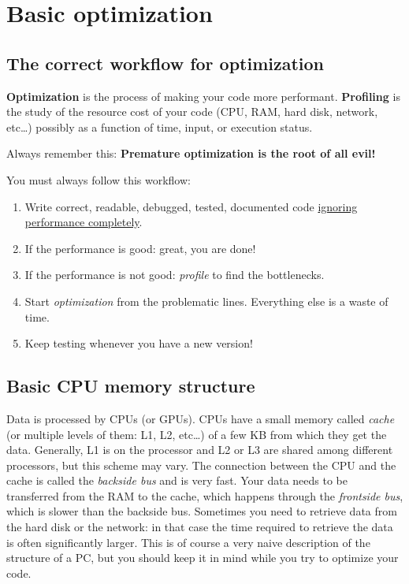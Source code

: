 \section{Basic optimization}

\subsection{The correct workflow for optimization}
\textbf{Optimization} is the process of making your code more performant. \textbf{Profiling} is the study of the resource cost of your code (CPU, RAM, hard disk, network, etc\dots) possibly as a function of time, input, or execution status.

Always remember this: \textbf{Premature optimization is the root of all evil!}

You must always follow this workflow:
\begin{enumerate}
    \item Write correct, readable, debugged, tested, documented code \underline{ignoring performance completely}.
    \item If the performance is good: great, you are done!
    \item If the performance is not good: \textit{profile} to find the bottlenecks.
    \item Start \textit{optimization} from the problematic lines. Everything else is a waste of time.
    \item Keep testing whenever you have a new version!
\end{enumerate}

\subsection{Basic CPU memory structure}
Data is processed by CPUs (or GPUs). CPUs have a small memory called \textit{cache} (or multiple levels of them: L1, L2, etc\dots) of a few KB from which they get the data. Generally, L1 is on the processor and L2 or L3 are shared among different processors, but this scheme may vary. The connection between the CPU and the cache is called the \textit{backside bus} and is very fast. Your data needs to be transferred from the RAM to the cache, which happens through the \textit{frontside bus}, which is slower than the backside bus. Sometimes you need to retrieve data from the hard disk or the network: in that case the time required to retrieve the data is often significantly larger. This is of course a very naive description of the structure of a PC, but you should keep it in mind while you try to optimize your code.

